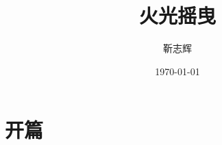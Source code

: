 \documentclass[12pt]{ctexrep}
\begin{document}
  

\title{火光摇曳}
\author{靳志辉}
\date{\today}

\maketitle
\tableofcontents

\chapter{开篇}


\end{document}
